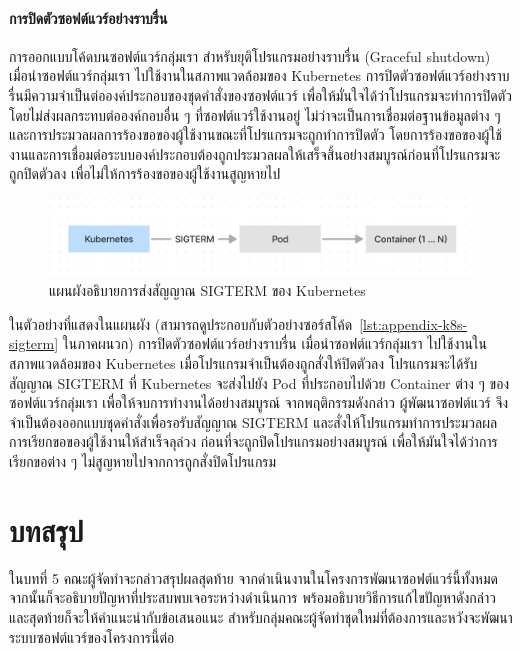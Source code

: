 \documentclass[12pt,one side,openright,a4paper]{cpe-thesis-th}
\newcommand{\thaijustify}[1]{%
  \par\hspace{30pt}\justifying
  #1
}
\begin{document}
\subsubsection{การปิดตัวซอฟต์แวร์อย่างราบรื่น}
\thaijustify{
  การออกแบบโค้ดบนซอฟต์แวร์กลุ่มเรา สำหรับยุติโปรแกรมอย่างราบรื่น (Graceful shutdown) เมื่อนำซอฟต์แวร์กลุ่มเรา ไปใช้งานในสภาพแวดล้อมของ Kubernetes การปิดตัวซอฟต์แวร์อย่างราบรื่นมีความจำเป็นต่อองค์ประกอบของชุดคำสั่งของซอฟต์แวร์ เพื่อให้มั่นใจได้ว่าโปรแกรมจะทำการปิดตัวโดยไม่ส่งผลกระทบต่อองค์กอบอื่น ๆ ที่ซอฟต์แวร์ใช้งานอยู่ ไม่ว่าจะเป็นการเชื่อมต่อฐานข้อมูลต่าง ๆ และการประมวลผลการร้องขอของผู้ใช้งานขณะที่โปรแกรมจะถูกทำการปิดตัว โดยการร้องขอของผู้ใช้งานและการเชื่อมต่อระบบองค์ประกอบต้องถูกประมวลผลให้เสร็จสิ้นอย่างสมบูรณ์ก่อนที่โปรแกรมจะถูกปิดตัวลง เพื่อไม่ให้การร้องขอของผู้ใช้งานสูญหายไป
}
\begin{figure}[H]
  \centering
  \includegraphics[width=12cm]{figure/results/k8s-sigterm.png}
  \caption[แผนผังอธิบายการส่งสัญญาณ SIGTERM ของ Kubernetes]{แผนผังอธิบายการส่งสัญญาณ SIGTERM ของ Kubernetes}
  \label{fig:res-k8s-sigterm}
\end{figure}
\thaijustify{
  ในตัวอย่างที่แสดงในแผนผัง (สามารถดูประกอบกับตัวอย่างซอร์สโค้ด~\ref{lst:appendix-k8s-sigterm} ในภาคผนวก) การปิดตัวซอฟต์แวร์อย่างราบรื่น เมื่อนำซอฟต์แวร์กลุ่มเรา ไปใช้งานในสภาพแวดล้อมของ Kubernetes เมื่อโปรแกรมจำเป็นต้องถูกสั่งให้ปิดตัวลง โปรแกรมจะได้รับสัญญาณ SIGTERM ที่ Kubernetes จะส่งไปยัง Pod ที่ประกอบไปด้วย Container ต่าง ๆ ของซอฟต์แวร์กลุ่มเรา เพื่อให้จบการทำงานได้อย่างสมบูรณ์ จากพฤติกรรมดังกล่าว ผู้พัฒนาซอฟต์แวร์ จึงจำเป็นต้องออกแบบชุดคำสั่งเพื่อรอรับสัญญาณ SIGTERM และสั่งให้โปรแกรมทำการประมวลผลการเรียกขอของผู้ใช้งานให้สำเร็จลุล่วง ก่อนที่จะถูกปิดโปรแกรมอย่างสมบูรณ์ เพื่อให้มันใจได้ว่าการเรียกขอต่าง ๆ ไม่สูญหายไปจากการถูกสั่งปิดโปรแกรม
}

\chapter{บทสรุป}
ในบทที่ 5 คณะผู้จัดทำจะกล่าวสรุปผลสุดท้าย จากดำเนินงานในโครงการพัฒนาซอฟต์แวร์นี้ทั้งหมด จากนั้นก็จะอธิบายปัญหาที่ประสบพบเจอระหว่างดำเนินการ พร้อมอธิบายวิธีการแก้ไขปัญหาดังกล่าว และสุดท้ายก็จะให้คำแนะนำกับข้อเสนอแนะ สำหรับกลุ่มคณะผู้จัดทำชุดใหม่ที่ต้องการและหวังจะพัฒนาระบบซอฟต์แวร์ของโครงการนี้ต่อ
\end{document}
